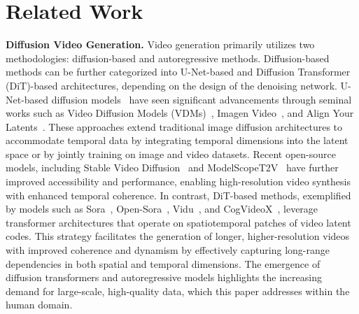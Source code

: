 \section{Related Work}
\noindent\textbf{Diffusion Video Generation.}
Video generation primarily utilizes two methodologies: diffusion-based and autoregressive methods. Diffusion-based methods can be further categorized into U-Net-based and Diffusion Transformer (DiT)-based architectures, depending on the design of the denoising network.
U-Net-based diffusion models~\cite{ho2022video, ho2022imagen, blattmann2023align, xu2024hallo, cui2024hallo2, zhu2024champ, zhang2024tora} have seen significant advancements through seminal works such as Video Diffusion Models (VDMs)~\cite{ho2022video}, Imagen Video~\cite{ho2022imagen}, and Align Your Latents~\cite{blattmann2023align}. These approaches extend traditional image diffusion architectures to accommodate temporal data by integrating temporal dimensions into the latent space or by jointly training on image and video datasets. Recent open-source models, including Stable Video Diffusion~\cite{blattmann2023stable} and ModelScopeT2V~\cite{wang2023modelscope} have further improved accessibility and performance, enabling high-resolution video synthesis with enhanced temporal coherence.
In contrast, DiT-based methods, exemplified by models such as Sora~\cite{liu2024sora}, Open-Sora~\cite{opensora}, Vidu~\cite{bao2024vidu}, and CogVideoX~\cite{yang2024cogvideox}, leverage transformer architectures that operate on spatiotemporal patches of video latent codes. This strategy facilitates the generation of longer, higher-resolution videos with improved coherence and dynamism by effectively capturing long-range dependencies in both spatial and temporal dimensions. The emergence of diffusion transformers and autoregressive models highlights the increasing demand for large-scale, high-quality data, which this paper addresses within the human domain.

